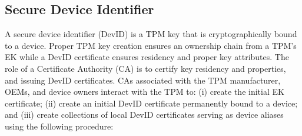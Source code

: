 \documentclass[runningheads]{llncs}
\begin{document}

\subsection{Secure Device Identifier}

A secure device identifier (DevID) is a TPM key that is
cryptographically bound to a device. Proper TPM key creation ensures
an ownership chain from a TPM's EK while a DevID certificate ensures
residency and proper key attributes.  The role of a Certificate
Authority (CA) is to certify key residency and properties, and issuing
DevID certificates.  CAs associated with the TPM manufacturer, OEMs,
and device owners interact with the TPM to: (i) create the initial EK
certificate; (ii) create an initial DevID certificate permanently
bound to a device; and (iii) create collections of local DevID
certificates serving as device aliases using the following procedure:


\end{document}
